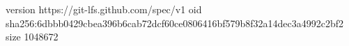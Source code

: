 version https://git-lfs.github.com/spec/v1
oid sha256:6dbbb0429cbea396b6cab72dcf60ce0806416bf579b8f32a14dec3a4992c2bf2
size 1048672
